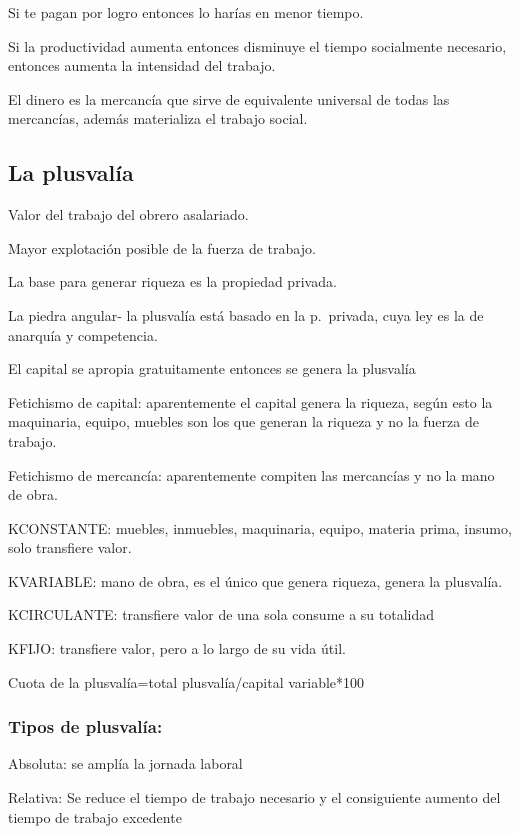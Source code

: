 \documentclass[
  letterpaper,
  DIV=11,
  numbers=noendperiod]{scrartcl}
\begin{document}
Si te pagan por logro entonces lo harías en menor tiempo.

Si la productividad aumenta entonces disminuye el tiempo socialmente
necesario, entonces aumenta la intensidad del trabajo.

El dinero es la mercancía que sirve de equivalente universal de todas
las mercancías, además materializa el trabajo social.

\hypertarget{la-plusvaluxeda}{%
\subsection{La plusvalía}\label{la-plusvaluxeda}}

Valor del trabajo del obrero asalariado.

Mayor explotación posible de la fuerza de trabajo.

La base para generar riqueza es la propiedad privada.

La piedra angular- la plusvalía está basado en la p.~privada, cuya ley
es la de anarquía y competencia.

El capital se apropia gratuitamente entonces se genera la plusvalía

Fetichismo de capital: aparentemente el capital genera la riqueza, según
esto la maquinaria, equipo, muebles son los que generan la riqueza y no
la fuerza de trabajo.

Fetichismo de mercancía: aparentemente compiten las mercancías y no la
mano de obra.

KCONSTANTE: muebles, inmuebles, maquinaria, equipo, materia prima,
insumo, solo transfiere valor.

KVARIABLE: mano de obra, es el único que genera riqueza, genera la
plusvalía.

KCIRCULANTE: transfiere valor de una sola consume a su totalidad

KFIJO: transfiere valor, pero a lo largo de su vida útil.

Cuota de la plusvalía=total plusvalía/capital variable*100

\hypertarget{tipos-de-plusvaluxeda}{%
\subsubsection{Tipos de plusvalía:}\label{tipos-de-plusvaluxeda}}

Absoluta: se amplía la jornada laboral

Relativa: Se reduce el tiempo de trabajo necesario y el consiguiente
aumento del tiempo de trabajo excedente
\end{document}
